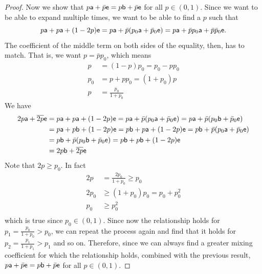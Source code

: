 \begin{proof}
	Now we show that $p\ens[a] + \bar{p} \ens = p \ens[b] + \bar{p} \ens$ for all $p \in (0,1)$. Since we want to be able to expand multiple times, we want to be able to find a $p$ such that
	\begin{equation}
		p \ens[a] + p \ens[a] + (1-2p) \ens = p \ens[a] + \bar{p} (p_0 \ens[a] + \bar{p}_0 \ens)= p \ens[a] + \bar{p} p_0 \ens[a] + \bar{p} \bar{p}_0 \ens.
	\end{equation}
	The coefficient of the middle term on both sides of the equality, then, has to match. That is, we want $p = \bar{p} p_0$, which means
	\begin{equation}
		\begin{aligned}
			p&=(1-p)p_0=p_0 - p p_0 \\
			p_0 &= p + p p_0 = (1+p_0) p  \\
			p &= \frac{p_0}{1+p_0}
		\end{aligned}
	\end{equation}
	We have
	\begin{equation}
		\begin{aligned}
			2p \ens[a] + \overline{2p} \ens &=  p \ens[a] + p \ens[a] + (1-2p) \ens =  p \ens[a] + \bar{p} (p_0 \ens[a] + \bar{p}_0 \ens) = p \ens[a] + \bar{p} (p_0 \ens[b] + \bar{p}_0 \ens) \\
			&= p \ens[a] + p \ens[b] + (1-2p) \ens = p \ens[b] + p \ens[a] + (1-2p) \ens = p \ens[b] + \bar{p} (p_0 \ens[a] + \bar{p}_0 \ens) \\
			&= p \ens[b] + \bar{p} (p_0 \ens[b] + \bar{p}_0 \ens) = p \ens[b] + p \ens[b] + (1-2p) \ens \\
			&= 2p \ens[b] + \overline{2p} \ens
		\end{aligned}
	\end{equation}
	Note that $2p \geq p_0$. In fact
	\begin{equation}
		\begin{aligned}
			2p &= \frac{2p_0}{1+p_0} \geq p_0  \\
			2 p_0 &\geq (1+p_0) p_0 = p_0 + p_0^2 \\
			p_0 &\geq p_0^2 \\
		\end{aligned}
	\end{equation}
	which is true since $p_0 \in (0,1)$. Since now the relationship holds for $p_1 = \frac{p_0}{1+p_0} > p_0 $, we can repeat the process again and find that it holds for $p_2 = \frac{p_1}{1+p_1} > p_1$ and so on. Therefore, since we can always find a greater mixing coefficient for which the relationship holds, combined with the previous result, $p\ens[a] + \bar{p} \ens = p \ens[b] + \bar{p} \ens$ for all $p \in (0,1)$.
	

\end{proof}
